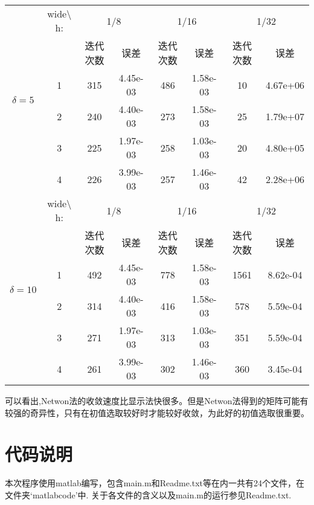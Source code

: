 \documentclass[11pt]{article}
\begin{document}
\begin{table}[ht!]
\begin{tabular}{  c| c|c c|c c| c c }
\hline



    \hline     
    \hline
    \multirow{6}{*}{$\delta=5$}
   &wide$\setminus$  h:	&\multicolumn{2}{|c|}{1/8}&\multicolumn{2}{|c|}{1/16}&\multicolumn{2}{|c}{1/32}\\
&	&迭代次数	&误差	&迭代次数	&误差  &迭代次数	&误差		\\
&1&315	&4.45e-03	&486	&1.58e-03	&10	&4.67e+06\\
&2&240	&4.40e-03	&273	&1.58e-03	&25	&1.79e+07\\
&3&225	&1.97e-03	&258	&1.03e-03	&20	&4.80e+05\\
&4&226	&3.99e-03	&257	&1.46e-03	&42	&2.28e+06\\
  \cline{1-8}     	
      \multirow{6}{*}{$\delta=10$}
   &wide$\setminus$  h:	&\multicolumn{2}{|c|}{1/8}&\multicolumn{2}{|c|}{1/16}&\multicolumn{2}{|c}{1/32}\\ 
&	&迭代次数	&误差	&迭代次数	&误差  &迭代次数	&误差		\\ 

&1&492	&4.45e-03	&778	&1.58e-03	&1561	&8.62e-04\\
&2&314	&4.40e-03	&416	&1.58e-03	&578	&5.59e-04\\
&3&271	&1.97e-03	&313	&1.03e-03	&351	&5.59e-04\\
&4&261	&3.99e-03	&302	&1.46e-03	&360	&3.45e-04\\      \hline      
  \hline
  
\hline


    \end{tabular}
\end{table}
可以看出,Netwon法的收敛速度比显示法快很多。但是Netwon法得到的矩阵可能有较强的奇异性，只有在初值选取较好时才能较好收敛，为此好的初值选取很重要。
\section{代码说明}
本次程序使用matlab编写，包含main.m和Readme.txt等在内一共有24个文件，在文件夹‘matlabcode’中. 关于各文件的含义以及main.m的运行参见Readme.txt.
\end{document}

